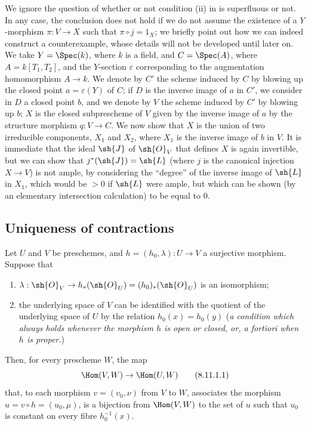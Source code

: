 \begin{remark}[8.10.7]
\label{II.8.10.7}
We ignore the question of whether or not condition (ii) in  is superfluous or not.
In any case, the conclusion does not hold if we do not assume the existence of a $Y$-morphism $\pi:V\to X$ such that $\pi\circ j=1_X$;
we briefly point out how we can indeed construct a counterexample, whose details will not be developed until later on.
We take $Y=\Spec(k)$, where $k$ is a field, and $C=\Spec(A)$, where $A=k[T_1,T_2]$, and the $Y$-section $\varepsilon$ corresponding to the augmentation homomorphism $A\to k$.
We denote by $C'$ the scheme induced by $C$ by blowing up the closed point $a=\varepsilon(Y)$ of $C$;
if $D$ is the inverse image of $a$ in $C'$, we consider in $D$ a closed point $b$,
and we denote by $V$ the scheme induced by $C'$ by blowing up $b$;
$X$ is the closed subprescheme of $V$ given by the inverse image of $a$ by the structure morphism $q:V\to C$.
We now show that $X$ is the union of two irreducible components, $X_1$ and $X_2$, where $X_1$ is the inverse image of $b$ in $V$.
It is immediate that the ideal $\sh{J}$ of $\sh{O}_V$ that defines $X$ is again invertible, but we can show that $j^*(\sh{J})=\sh{L}$ (where $j$ is the canonical injection $X\to V$) is not ample, by considering the ``degree'' of the inverse image of $\sh{L}$ in $X_1$, which would be $>0$ if $\sh{L}$ were ample, but which can be shown (by an elementary intersection calculation) to be equal to $0$.
\end{remark}


\subsection{Uniqueness of contractions}
\label{subsection:II.8.11}

\begin{lemma}[8.11.1]
\label{II.8.11.1}
Let $U$ and $V$ be preschemes, and $h=(h_0,\lambda):U\to V$ a surjective morphism.
Suppose that
\begin{enumerate}
    \item $\lambda:\sh{O}_V\to h_*(\sh{O}_U) = (h_0)_*(\sh{O}_U)$ is an isomorphism;
    \item the underlying space of $V$ can be identified with the quotient of the underlying space of $U$ by the relation $h_0(x)=h_0(y)$ (\emph{a condition which always holds whenever the morphism $h$ is \emph{open} or \emph{closed}, or, \emph{a fortiori} when $h$ is \emph{proper}.})
\end{enumerate}
Then, for every prescheme $W$, the map
\[
\label{II.8.11.1.1}
    \Hom(V,W) \to \Hom(U,W)
\tag{8.11.1.1}
\]
that, to each morphism $v=(v_0,\nu)$ from $V$ to $W$, associates the morphism $u=v\circ h=(u_0,\mu)$, is a bijection from $\Hom(V,W)$ to the set of $u$ such that $u_0$ is constant on every fibre $h_0^{-1}(x)$.
\end{lemma}

